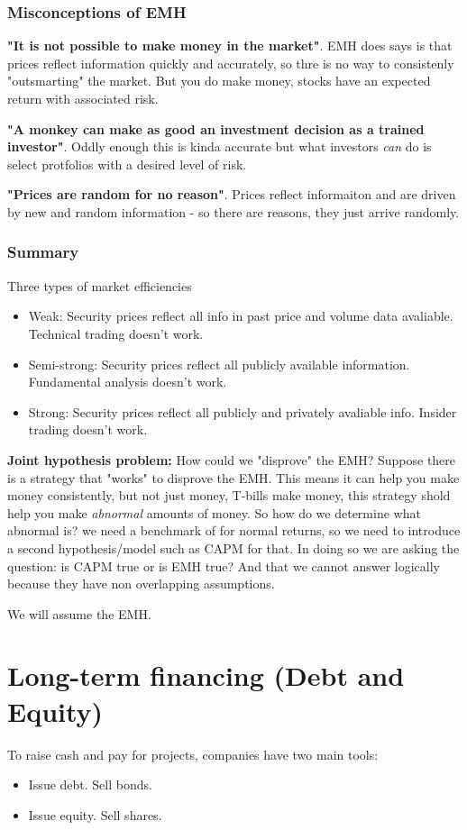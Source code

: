 \documentclass{article}
\begin{document}
\subsubsection{Misconceptions of EMH}
\textbf{"It is not possible to make money in the market"}. EMH does says is that prices reflect information quickly and accurately, so thre is no way to consistenly "outsmarting" the market. But you do make money, stocks have an expected return with associated risk.

\textbf{"A monkey can make as good an investment decision as a trained investor"}. Oddly enough this is kinda accurate but what investors \textit{can} do is select protfolios with a desired level of risk. 

\textbf{"Prices are random for no reason"}. Prices reflect informaiton and are driven by new and random information - so there are reasons, they just arrive randomly. 


\subsubsection{Summary}
Three types of market efficiencies
\begin{itemize}
\item Weak: Security prices reflect all info in past price and volume data avaliable. Technical trading doesn't work.
\item Semi-strong: Security prices reflect all publicly available information. Fundamental analysis doesn't work.
\item Strong: Security prices reflect all publicly and privately avaliable info. Insider trading doesn't work.
\end{itemize}
 
\textbf{Joint hypothesis problem:} How could we "disprove" the EMH? Suppose there is a strategy that "works" to disprove the EMH. This means it can help you make money consistently, but not just money, T-bills make money, this strategy shold help you make \textit{abnormal} amounts of money. So how do we determine what abnormal is? we need a benchmark of for normal returns, so we need to introduce a second hypothesis/model such as CAPM for that. In doing so we are asking the question: is CAPM true or is EMH true? And that we cannot answer logically because they have non overlapping assumptions.

We will assume the EMH.  

\section{Long-term financing (Debt and Equity)}
To raise cash and pay for projects, companies have two main tools: 
\begin{itemize}
\item Issue debt. Sell bonds. 
\item Issue equity. Sell shares.
\end{itemize}
\end{document}
